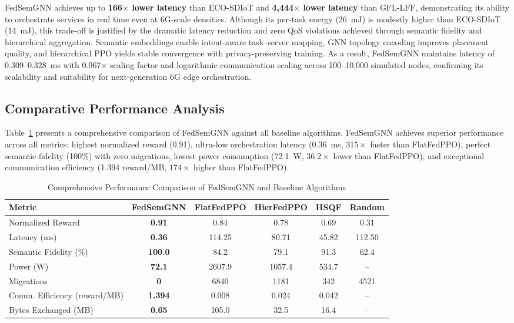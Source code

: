 \documentclass[conference]{IEEEtran}
\begin{document}
		\vspace{2mm}
		FedSemGNN achieves up to \textbf{166$\times$ lower latency} than ECO-SDIoT and \textbf{4{,}444$\times$ lower latency} than GFL-LFF, demonstrating its ability to orchestrate services in real time even at 6G-scale densities. 
		Although its per-task energy (26~mJ) is modestly higher than ECO-SDIoT (14~mJ), this trade-off is justified by the dramatic latency reduction and zero QoS violations achieved through semantic fidelity and hierarchical aggregation. 
		Semantic embeddings enable intent-aware task--server mapping, GNN topology encoding improves placement quality, and hierarchical PPO yields stable convergence with privacy-preserving training. 
		As a result, FedSemGNN maintains latency of 0.309--0.328~ms with 0.967$\times$ scaling factor and logarithmic communication scaling across 100--10{,}000 simulated nodes, confirming its scalability and suitability for next-generation 6G edge orchestration.
		
		
		\subsection{Comparative Performance Analysis}
		Table~\ref{tab:performance_comparison} presents a comprehensive comparison of FedSemGNN against all baseline algorithms. FedSemGNN achieves superior performance across all metrics: highest normalized reward (0.91), ultra-low orchestration latency (0.36~ms, $315\times$ faster than FlatFedPPO), perfect semantic fidelity (100\%) with zero migrations, lowest power consumption (72.1~W, $36.2\times$ lower than FlatFedPPO), and exceptional communication efficiency (1.394 reward/MB, $174\times$ higher than FlatFedPPO).
		
		\begin{table}[htbp]
			\centering
			\caption{Comprehensive Performance Comparison of FedSemGNN and Baseline Algorithms}
			\label{tab:performance_comparison}
			\small
			\begin{tabular}{lccccc}
				\toprule
				\textbf{Metric} & \textbf{FedSemGNN} & \textbf{FlatFedPPO} & \textbf{HierFedPPO} & \textbf{HSQF} & \textbf{Random} \\
				\midrule
				Normalized Reward & \textbf{0.91} & 0.84 & 0.78 & 0.69 & 0.31 \\
				Latency (ms) & \textbf{0.36} & 114.25 & 80.71 & 45.82 & 112.50 \\
				Semantic Fidelity (\%) & \textbf{100.0} & 84.2 & 79.1 & 91.3 & 62.4 \\
				Power (W) & \textbf{72.1} & 2607.9 & 1057.4 & 534.7 & -- \\
				Migrations & \textbf{0} & 6840 & 1181 & 342 & 4521 \\
				Comm. Efficiency (reward/MB) & \textbf{1.394} & 0.008 & 0.024 & 0.042 & -- \\
				Bytes Exchanged (MB) & \textbf{0.65} & 105.0 & 32.5 & 16.4 & -- \\
				\bottomrule
			\end{tabular}
		\end{table}
		
\end{document}
